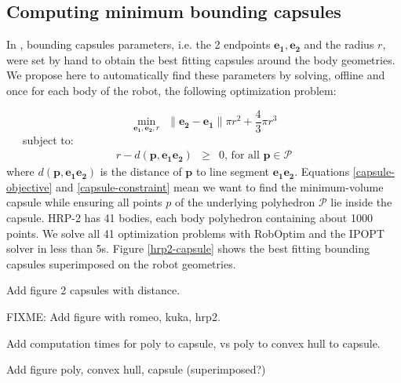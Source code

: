\subsection{Computing minimum bounding capsules}
In \cite{Kanoun2011}, bounding capsules parameters, i.e. the 2
endpoints $\mathbf{e_1}, \mathbf{e_2}$ and the radius $r$, were set by
hand to obtain the best fitting capsules around the body
geometries. We propose here to automatically find these parameters by
solving, offline and once for each body of the robot, the following
optimization problem:

\begin{equation}
  \min_{\mathbf{e_1}, \mathbf{e_2}, r} \ \ 
  \|\mathbf{e_2} - \mathbf{e_1}\| \pi r^2 + \frac{4}{3}\pi r^3
  \label{capsule-objective}
\end{equation}
\ \ \ subject to:
\begin{equation}
  \begin{array}{rcll}
    r - d(\mathbf{p},\mathbf{e_1e_2}) & \ge & 0\mbox{, for all }
    \mathbf{p} \in \mathcal{P}
    \label{capsule-constraint}
  \end{array}
\end{equation} 
where $d(\mathbf{p},\mathbf{e_1e_2})$ is the distance of $\mathbf{p}$
to line segment $\mathbf{e_1e_2}$.  Equations \ref{capsule-objective}
and \ref{capsule-constraint} mean we want to find the minimum-volume
capsule while ensuring all points $p$ of the underlying polyhedron
$\mathcal{P}$ lie inside the capsule. HRP-2 has 41 bodies, each body
polyhedron containing about 1000 points. We solve all 41 optimization
problems with RobOptim \cite{roboptim, moulard2012optimisation} and
the IPOPT solver \cite{Biegler2009} in less than 5s. Figure
\ref{hrp2-capsule} shows the best fitting bounding capsules
superimposed on the robot geometries.

Add figure 2 capsules with distance.

FIXME: Add figure with romeo, kuka, hrp2.

Add computation times for poly to capsule, vs poly to convex hull to
capsule.


Add figure poly, convex hull, capsule (superimposed?)

